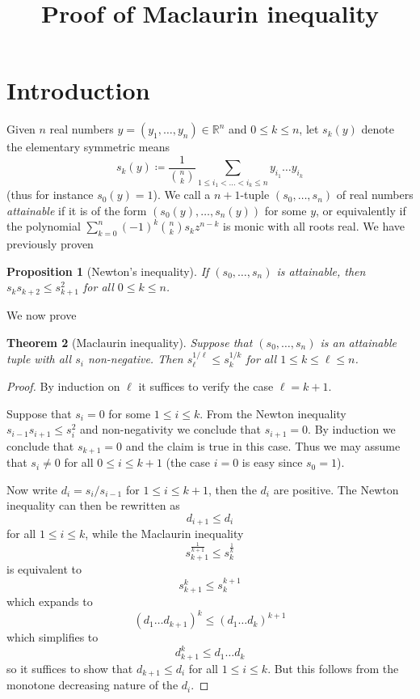 \documentclass[12pt,a4paper,reqno]{amsart}
\numberwithin{equation}{section}
\theoremstyle{plain}
\newtheorem{theorem}{Theorem}[section]
\newtheorem{proposition}[theorem]{Proposition}
\theoremstyle{definition}
\newcommand\R{\mathbb{R}}
\begin{document}
\title{Proof of Maclaurin inequality}

\author{} %
\address{}%
\email{}%



\maketitle


\section{Introduction}

Given $n$ real numbers $y = (y_1,\dots,y_n) \in \R^n$ and $0 \leq k \leq n$, let $s_k(y)$ denote the elementary symmetric means
$$ s_k(y) \coloneqq \frac{1}{\binom{n}{k}} \sum_{1 \leq i_1 < \dots < i_k \leq n} y_{i_1} \dots y_{i_k}$$
(thus for instance $s_0(y)=1$).  
We call a $n+1$-tuple $(s_0,\dots,s_n)$ of real numbers \emph{attainable} if it is of the form $(s_0(y),\dots,s_n(y))$ for some $y$, or equivalently if the polynomial $\sum_{k=0}^n (-1)^k \binom{n}{k} s_k z^{n-k}$ is monic with all roots real.  We have previously proven



\begin{proposition}[Newton's inequality]\label{prop-newton} If $(s_0,\dots,s_n)$ is attainable, then $s_k s_{k+2} \leq s_{k+1}^2$ for all $0 \leq k \leq n$.
\end{proposition}

We now prove

\begin{theorem}[Maclaurin inequality]\label{thm-maclaurin}  Suppose that $(s_0,\dots,s_n)$ is an attainable tuple with all $s_i$ non-negative.  Then $s_\ell^{1/\ell} \leq s_k^{1/k}$ for all $1 \leq k \leq \ell \leq n$.
\end{theorem}

\begin{proof}  By induction on $\ell$ it suffices to verify the case $\ell=k+1$.

Suppose that $s_i=0$ for some $1 \leq i \leq k$.  From the Newton inequality $s_{i-1} s_{i+1} \leq s_i^2$ and non-negativity we conclude that $s_{i+1}=0$.  By induction we conclude that $s_{k+1}=0$ and the claim is true in this case.  Thus we may assume that $s_i \neq 0$ for all $0 \leq i \leq k+1$ (the case $i=0$ is easy since $s_0=1$).

Now write $d_i = s_i / s_{i-1}$ for $1 \leq i \leq k+1$, then the $d_i$ are positive.  The Newton inequality can then be rewritten as
$$ d_{i+1} \leq d_i$$
for all $1 \leq i \leq k$, while the Maclaurin inequality
$$ s_{k+1}^{\frac{1}{k+1}} \leq s_k^{\frac{1}{k}}$$
is equivalent to
$$ s_{k+1}^k \leq s_k^{k+1}$$
which expands to
$$ (d_1 \dots d_{k+1})^k \leq (d_1 \dots d_k)^{k+1}$$
which simplifies to
$$ d_{k+1}^k \leq d_1 \dots d_k$$
so it suffices to show that $d_{k+1} \leq d_i$ for all $1 \leq i \leq k$.  But this follows from the monotone decreasing nature of the $d_i$.
\end{proof}
\end{document}
